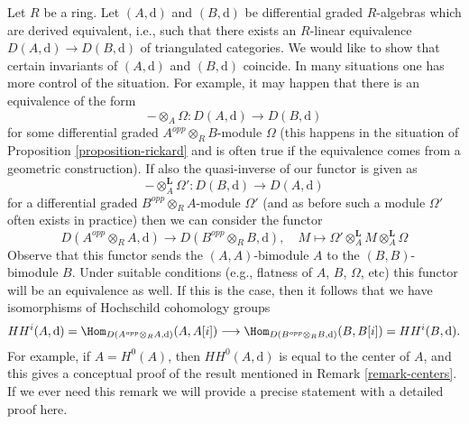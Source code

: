 \begin{remark}
\label{remark-hochschild-cohomology}
Let $R$ be a ring. Let $(A, \text{d})$ and $(B, \text{d})$ be differential
graded $R$-algebras which are derived equivalent, i.e., such that there
exists an $R$-linear equivalence $D(A, \text{d}) \to D(B, \text{d})$
of triangulated categories. We would like to show that certain invariants
of $(A, \text{d})$ and $(B, \text{d})$ coincide. In many situations
one has more control of the situation. For example, it may happen
that there is an equivalence of the form
$$
- \otimes_A \Omega : D(A, \text{d}) \longrightarrow D(B, \text{d})
$$
for some differential graded $A^{opp}\otimes_R B$-module
$\Omega$ (this happens in the situation of
Proposition \ref{proposition-rickard} and is often true
if the equivalence comes from a geometric construction).
If also the quasi-inverse of our functor is given as
$$
- \otimes_A^\mathbf{L} \Omega' : D(B, \text{d}) \longrightarrow D(A, \text{d})
$$
for a differential graded $B^{opp}\otimes_R A$-module $\Omega'$
(and as before such a module $\Omega'$ often exists in practice)
then we can consider the functor
$$
D(A^{opp} \otimes_R A, \text{d})
\longrightarrow
D(B^{opp} \otimes_R B, \text{d}),\quad
M \longmapsto \Omega' \otimes^\mathbf{L}_A M \otimes_A^\mathbf{L} \Omega
$$
Observe that this functor sends the $(A, A)$-bimodule $A$ to
the $(B, B)$-bimodule $B$. Under suitable conditions
(e.g., flatness of $A$, $B$, $\Omega$, etc)
this functor will be an equivalence as well.
If this is the case, then it follows that we have isomorphisms
of Hochschild cohomology groups
$$
HH^i(A, \text{d}) =
\Hom_{D(A^{opp} \otimes_R A, \text{d})}(A, A[i])
\longrightarrow
\Hom_{D(B^{opp} \otimes_R B, \text{d})}(B, B[i]) =
HH^i(B, \text{d}).
$$
For example, if $A = H^0(A)$, then $HH^0(A, \text{d})$
is equal to the center of $A$, and this gives a conceptual proof
of the result mentioned in Remark \ref{remark-centers}.
If we ever need this remark we will provide a precise statement
with a detailed proof here.
\end{remark}












